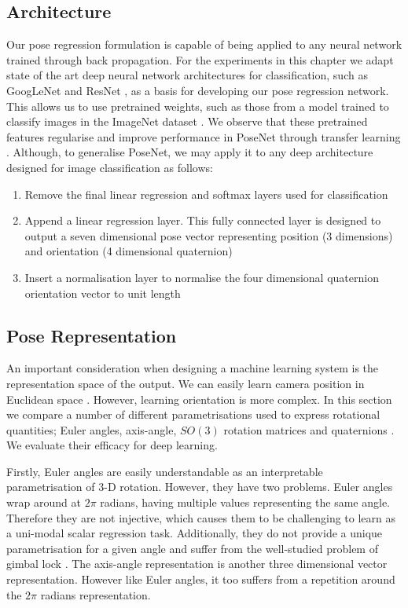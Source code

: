 \subsection{Architecture}

Our pose regression formulation is capable of being applied to any neural network trained through back propagation. For the experiments in this chapter we adapt state of the art deep neural network architectures for classification, such as GoogLeNet \citep{szegedy2014going} and ResNet \citep{he2016deep}, as a basis for developing our pose regression network. This allows us to use pretrained weights, such as those from a model trained to classify images in the ImageNet dataset \citep{deng2009imagenet}. We observe that these pretrained features regularise and improve performance in PoseNet through transfer learning \citep{oquab2014learning}. Although, to generalise PoseNet, we may apply it to any deep architecture designed for image classification as follows:

\begin{enumerate}
	\item Remove the final linear regression and softmax layers used for classification
	\item Append a linear regression layer. This fully connected layer is designed to output a seven dimensional pose vector representing position (3 dimensions) and orientation (4 dimensional quaternion)
	\item Insert a normalisation layer to normalise the four dimensional quaternion orientation vector to unit length
\end{enumerate}

\subsection{Pose Representation}
\label{sec:rot}

An important consideration when designing a machine learning system is the representation space of the output. We can easily learn camera position in Euclidean space \citep{kendall2015posenet}. However, learning orientation is more complex. In this section we compare a number of different parametrisations used to express rotational quantities; Euler angles, axis-angle, $SO(3)$ rotation matrices and quaternions \citep{altmann2005rotations}. We evaluate their efficacy for deep learning.

Firstly, Euler angles are easily understandable as an interpretable parametrisation of 3-D rotation. However, they have two problems. Euler angles wrap around at $2\pi$ radians, having multiple values representing the same angle. Therefore they are not injective, which causes them to be challenging to learn as a uni-modal scalar regression task. Additionally, they do not provide a unique parametrisation for a given angle and suffer from the well-studied problem of gimbal lock \citep{altmann2005rotations}. The axis-angle representation is another three dimensional vector representation. However like Euler angles, it too suffers from a repetition around the $2\pi$ radians representation.

